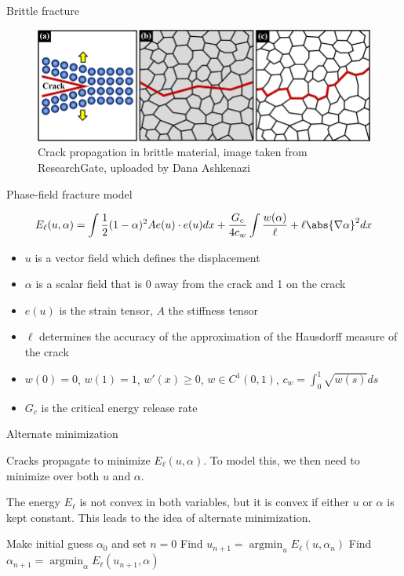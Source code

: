 \documentclass{beamer}
\DeclareMathOperator{\argmin}{argmin}
\begin{document}
\begin{frame}{Brittle fracture}

\begin{figure}
\includegraphics[width=\textwidth]{Fractures/FIG_BrittleFracture.png}
\caption{Crack propagation in brittle material, image taken from ResearchGate, uploaded by Dana Ashkenazi}
\end{figure}
\end{frame}

\begin{frame}{Phase-field fracture model}

\begin{equation*}
	E_\ell(u,\alpha) = \int \frac{1}{2} (1 - \alpha)^2 A e(u) \cdot e(u) dx + \frac{G_c}{4 c_w} \int \frac{w(\alpha)}{\ell} + \ell \abs{\nabla \alpha}^2 dx
\end{equation*}
\begin{itemize}
\item $u$ is a vector field which defines the displacement
\item $\alpha$ is a scalar field that is 0 away from the crack and 1 on the crack
\item $e(u)$ is the strain tensor, $A$ the stiffness tensor
\item $\ell$ determines the accuracy of the approximation of the Hausdorff measure of the crack
\item $w(0)=0$, $w(1)=1$, $w'(x) \geq 0$, $w \in C^1(0,1)$, $c_w = \int_0^1 \sqrt{w(s)} ds$
\item $G_c$ is the critical energy release rate
\end{itemize}
\end{frame}

\begin{frame}{Alternate minimization}

Cracks propagate to minimize $E_\ell(u,\alpha)$.
To model this, we then need to minimize over both $u$ and $\alpha$.

The energy $E_\ell$ is not convex in both variables, but it is convex if either $u$ or $\alpha$ is kept constant.
This leads to the idea of alternate minimization.
\begin{algorithm}[H]
	\caption{Alternate Minimization (AltMin)}
	\begin{algorithmic}[1]
		\State Make initial guess $\alpha_0$ and set $n=0$
			\State Find $u_{n+1} = \argmin_u E_\ell(u, \alpha_n)$
			\State Find $\alpha_{n+1} = \argmin_\alpha E_\ell(u_{n+1},\alpha)$
		\EndWhile
	\end{algorithmic}
\end{algorithm}
\end{frame}
\end{document}
